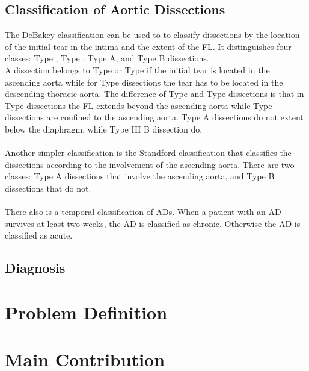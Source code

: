 \documentclass[thesis.tex]{subfiles}
\begin{document}
\subsection{Classification of Aortic Dissections}
The DeBakey classification \cite{desanctis1987aortic,goldfinger2014thoracic,criado2011aortic} can be used to to classify dissections by the location of the initial tear in the intima and the extent of the FL. It distinguishes four classes: Type , Type , Type  A, and Type  B dissections. \\ A dissection belongs to Type  or Type  if the initial tear is located in the ascending aorta while for Type  dissections the tear has to be located in the descending thoracic aorta. The difference of Type  and Type  dissections is that in Type  dissections the FL extends beyond the ascending aorta while Type  dissections are confined to the ascending aorta. Type  A dissections do not extent below the diaphragm, while Type III B dissection do. 
\\ \\
Another simpler classification is the Standford classification \cite{desanctis1987aortic,goldfinger2014thoracic,criado2011aortic} that classifies the dissections according to the involvement of the ascending aorta. There are two classes: Type A dissections that involve the ascending aorta, and Type B dissections that do not. 
\\ \\
There also is a temporal classification of ADs. When a patient with an AD survives at least two weeks, the AD is classified as chronic. Otherwise the AD is classified as acute.\cite{olsson2007thoracic,desanctis1987aortic,criado2011aortic}

\subsection{Diagnosis}

\section{Problem Definition}

\section{Main Contribution}
\end{document}
